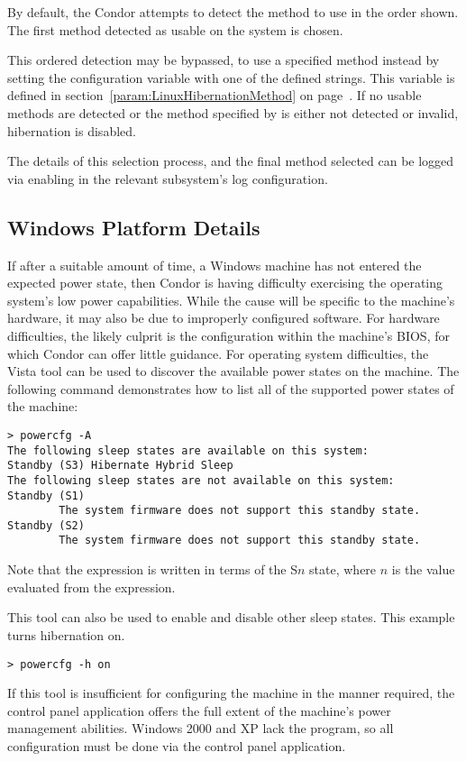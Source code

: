 By default, the Condor attempts to detect the method
to use in the order shown.  The first method detected as usable
on the system is chosen.

This ordered detection may be bypassed,
to use a specified method instead by setting the configuration
variable  with
one of the defined strings.
This variable is defined in 
section~\ref{param:LinuxHibernationMethod} on
page~\pageref{param:LinuxHibernationMethod}.
If no usable methods are detected or the method specified by
 is either not detected or invalid,
hibernation is disabled.

The details of this selection process, and the final method selected
can be logged via enabling  in the relevant
subsystem's log configuration.


\subsection{Windows Platform Details}

If after a suitable amount of time,
a Windows machine has not entered the expected power state,
then Condor is having difficulty exercising the operating system's
low power capabilities.  
While the cause will be specific to the machine's hardware,
it may also be due to improperly configured software.  
For hardware difficulties,
the likely culprit is the configuration within the machine's BIOS,
for which Condor can offer little guidance.
For operating system difficulties,
the Vista  tool can be used to discover the available 
power states on the machine.
The following command demonstrates how to
list all of the supported power states of the machine:

\begin{verbatim}
> powercfg -A
The following sleep states are available on this system: 
Standby (S3) Hibernate Hybrid Sleep
The following sleep states are not available on this system:
Standby (S1)
        The system firmware does not support this standby state.
Standby (S2)
        The system firmware does not support this standby state.
\end{verbatim}

Note that the  expression is written in terms of the 
S$n$ state, where $n$ is the value evaluated from the expression.

This tool can also be used to enable and disable other sleep states.
This example turns hibernation on.

\begin{verbatim}
> powercfg -h on
\end{verbatim}

If this tool is insufficient for configuring the machine in the manner required,
the  control panel application offers
the full extent of the machine's power management abilities.
Windows 2000 and XP lack the  program,
so all configuration must be done via the 
control panel application.

